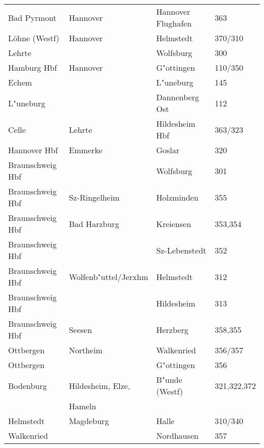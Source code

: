 \begin{table}[h]
\begin{tabular}{l|l|l|l}
	Bad Pyrmont      & Hannover             & Hannover Flughafen & 363\\
	Löhne (Westf)    & Hannover             & Helmstedt          & 370/310\\
	Lehrte           &                      & Wolfsburg          & 300\\
	Hamburg Hbf      & Hannover             & G"ottingen         & 110/350\\
	Echem            &                      & L"uneburg          & 145\\
	L"uneburg        &                      & Dannenberg Ost     & 112\\
	Celle            & Lehrte               & Hildesheim Hbf     & 363/323\\
	Hannover Hbf     & Emmerke              & Goslar             & 320\\
	Braunschweig Hbf &                      & Wolfsburg          & 301\\
	Braunschweig Hbf & Sz-Ringelheim        & Holzminden         & 355\\
	Braunschweig Hbf & Bad Harzburg         & Kreiensen          & 353,354\\
	Braunschweig Hbf &                      & Sz-Lebenstedt      & 352\\
	Braunschweig Hbf & Wolfenb"uttel/Jerxhm & Helmstedt          & 312\\
	Braunschweig Hbf &                      & Hildesheim         & 313\\
	Braunschweig Hbf & Seesen               & Herzberg           & 358,355\\
	Ottbergen        & Northeim             & Walkenried         & 356/357\\
	Ottbergen        &                      & G"ottingen         & 356\\
	Bodenburg        & Hildesheim, Elze,    & B"unde (Westf)     & 321,322,372\\
	                 & Hameln               &                    & \\
	Helmstedt        & Magdeburg            & Halle              & 310/340\\
	Walkenried       &                      & Nordhausen         & 357\\
\end{tabular}
\end{table}


\ifpdf

\fi